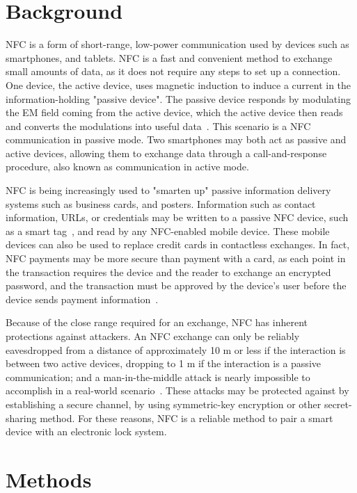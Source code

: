\documentclass{article}
\begin{document}
\section{Background}

NFC is a form of short-range, low-power communication used by devices such as smartphones, and tablets. NFC is a fast
and convenient method to exchange small amounts of data, as it does not require any steps to set up a connection. One
device, the active device, uses magnetic induction to induce a current in the information-holding "passive device". The
passive device responds by modulating the EM field coming from the active device, which the active device then reads and
converts the modulations into useful data~\autocite{NFCORG}. This scenario is a NFC communication in passive mode. Two
smartphones may both act as passive and active devices, allowing them to exchange data through a call-and-response procedure,
also known as communication in active mode.

NFC is being increasingly used to "smarten up" passive information delivery systems such as business cards, and posters.
Information such as contact information, URLs, or credentials may be written to a passive NFC device, such as a smart
tag~\autocite{NFCFORUMWHATIS}, and read by any NFC-enabled mobile device. These mobile devices can also be used to
replace credit cards in contactless exchanges. In fact, NFC payments may be more secure than payment with a card, as
each point in the transaction requires the device and the reader to exchange an encrypted password, and the transaction
 must be approved by the device's user before the device sends payment information~\autocite{NFCPAYMENT}.

Because of the close range required for an exchange, NFC has inherent protections against attackers. An NFC exchange
can only be reliably eavesdropped from a distance of approximately 10 m or less if the interaction is between two active
devices, dropping to 1 m if the interaction is a passive communication; and a man-in-the-middle attack is nearly
impossible to accomplish in a real-world scenario~\autocite{NFCSECURITY}. These attacks may be protected against by
establishing a secure channel, by using symmetric-key encryption or other secret-sharing method. For these reasons,
NFC is a reliable method to pair a smart device with an electronic lock system.

\section{Methods}
\end{document}
